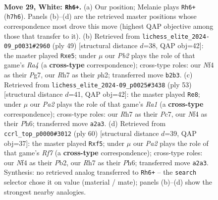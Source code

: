 \documentclass[11pt]{article}
\begin{document}
\clearpage

\begin{figure}[p]\centering
\begin{subfigure}{0.46\textwidth}\centering
\resizebox{\linewidth}{!}{%
\newchessgame
\chessboard[
  setfen={8/ppp4R/2k5/5p2/4pN2/8/PPr2r1P/1R2K3 w - - 2 29},
  showmover=false,
  pgfstyle=straightmove, color=movearrow, markmove={h7-h6}
]}
\caption{}
\end{subfigure}\hfill
\begin{subfigure}{0.46\textwidth}\centering
\resizebox{\linewidth}{!}{%
\newchessgame
\chessboard[
  setfen={r5k1/2p2Rpp/p7/r3P3/8/8/1P4PP/5R1K b - - 0 25},
  showmover=false,
  pgfstyle=straightmove, color=movearrow, markmove={a5-e5}
]}
\caption{}
\end{subfigure}
\\[4pt]
\begin{subfigure}{0.46\textwidth}\centering
\resizebox{\linewidth}{!}{%
\newchessgame
\chessboard[
  setfen={r7/p1p2r1k/2p1p1Rp/4P2P/8/8/PPP5/2K3R1 b - - 3 27},
  showmover=false,
  pgfstyle=straightmove, color=movearrow, markmove={a8-e8}
]}
\caption{}
\end{subfigure}\hfill
\begin{subfigure}{0.46\textwidth}\centering
\resizebox{\linewidth}{!}{%
\newchessgame
\chessboard[
  setfen={2r4k/5R1p/p6P/1p3p2/8/8/PPr5/1K5R w - - 0 31},
  showmover=false,
  pgfstyle=straightmove, color=movearrow, markmove={f7-f5}
]}
\caption{}
\end{subfigure}
\caption{\textbf{Move 29, White: \texttt{Rh6+}.} (a) Our position; Melanie plays \texttt{Rh6+} (\texttt{h7h6}). Panels (b)--(d) are the retrieved master positions whose correspondence most drove this move (highest QAP objective among those that transfer to it). (b) Retrieved from \texttt{lichess\_elite\_2024-09\_p0031\#2960} (ply 49) [structural distance $d$=38, QAP obj=42]: the master played \texttt{Rxe5}; under $\mu$ our \emph{Pb2} plays the role of that game's \emph{Ra4} (a \textbf{cross-type} correspondence); cross-type roles: our \emph{N}f4 as their \emph{P}g7, our \emph{R}h7 as their \emph{p}h2; transferred move \texttt{b2b3}. (c) Retrieved from \texttt{lichess\_elite\_2024-09\_p0025\#3438} (ply 53) [structural distance $d$=41, QAP obj=42]: the master played \texttt{Re8}; under $\mu$ our \emph{Pa2} plays the role of that game's \emph{Ra1} (a \textbf{cross-type} correspondence); cross-type roles: our \emph{R}h7 as their \emph{P}c7, our \emph{N}f4 as their \emph{P}h6; transferred move \texttt{a2a3}. (d) Retrieved from \texttt{ccrl\_top\_p0000\#3012} (ply 60) [structural distance $d$=39, QAP obj=37]: the master played \texttt{Rxf5}; under $\mu$ our \emph{Pa2} plays the role of that game's \emph{Rf7} (a \textbf{cross-type} correspondence); cross-type roles: our \emph{N}f4 as their \emph{P}b2, our \emph{R}h7 as their \emph{P}h6; transferred move \texttt{a2a3}. Synthesis: no retrieved analog transferred to \texttt{Rh6+} -- the \texttt{search} selector chose it on value (material / mate); panels (b)--(d) show the strongest nearby analogies.}
\label{fig:thought-m56}
\end{figure}
\end{document}
